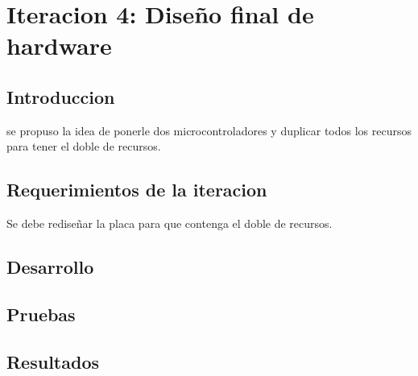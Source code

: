 \chapter{Iteracion 4: Diseño final de hardware} %
\label{cha:iteracion_4}

\section{Introduccion} %
\label{sec:introduccion}

se propuso la idea de ponerle dos microcontroladores y duplicar todos los recursos para tener el doble de recursos. 


\section{Requerimientos de la iteracion} %
\label{sec:requerimientos_de_la_iteracion}

Se debe rediseñar la placa para que contenga el doble de recursos. 


\section{Desarrollo} %
\label{sec:desarrollo}


\section{Pruebas} %
\label{sec:pruebas}


\section{Resultados} %
\label{sec:resultados}


